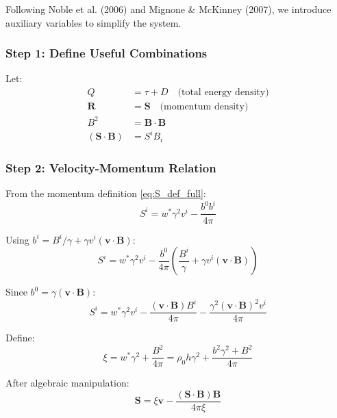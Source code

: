 \documentclass[12pt,a4paper]{article}
\begin{document}
Following Noble et al. (2006) and Mignone \& McKinney (2007), we introduce
auxiliary variables to simplify the system.

\subsubsection{Step 1: Define Useful Combinations}

Let:
\begin{align}
Q &= \tau + D \quad \text{(total energy density)} \label{eq:Q_def} \\
\bm{R} &= \bm{S} \quad \text{(momentum density)} \\
B^2 &= \bm{B} \cdot \bm{B} \\
(\bm{S} \cdot \bm{B}) &= S^i B_i
\end{align}

\subsubsection{Step 2: Velocity-Momentum Relation}

From the momentum definition \eqref{eq:S_def_full}:
\begin{equation}
S^i = w^* \gamma^2 v^i - \frac{b^0 b^i}{4\pi}
\label{eq:Si_expanded}
\end{equation}

Using $b^i = B^i/\gamma + \gamma v^i (\bm{v} \cdot \bm{B})$:
\begin{equation}
S^i = w^* \gamma^2 v^i - \frac{b^0}{4\pi}\left(\frac{B^i}{\gamma} + \gamma v^i (\bm{v} \cdot \bm{B})\right)
\end{equation}

Since $b^0 = \gamma (\bm{v} \cdot \bm{B})$:
\begin{equation}
S^i = w^* \gamma^2 v^i - \frac{(\bm{v} \cdot \bm{B}) B^i}{4\pi}
- \frac{\gamma^2 (\bm{v} \cdot \bm{B})^2 v^i}{4\pi}
\label{eq:Si_intermediate}
\end{equation}

Define:
\begin{equation}
\xi = w^* \gamma^2 + \frac{B^2}{4\pi} = \rho_0 h \gamma^2 + \frac{b^2 \gamma^2 + B^2}{4\pi}
\label{eq:xi_def}
\end{equation}

After algebraic manipulation:
\begin{equation}
\bm{S} = \xi \bm{v} - \frac{(\bm{S} \cdot \bm{B})\bm{B}}{4\pi \xi}
\label{eq:S_xi_relation}
\end{equation}
\end{document}
